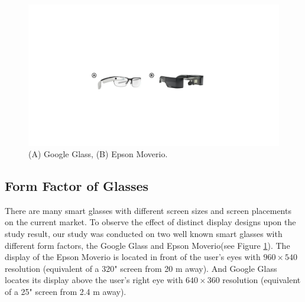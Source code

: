 \documentclass{sigchi}
\begin{document}
    \begin{figure}[!h]
  \centering
  \includegraphics[width=1\columnwidth]{Glasses.pdf}
  \caption{(A) Google Glass, (B) Epson Moverio.}
  \label{fig:Glasses}
  \end{figure}

\subsection {Form Factor of Glasses}
  There are many smart glasses with different screen sizes and screen placements on the current market. To observe the effect of distinct display designs upon the study result, our study was conducted on two well known smart glasses with different form factors, the Google Glass and Epson Moverio(see Figure \ref{fig:Glasses}). The display of the Epson Moverio is located in front of the user's eyes with $960 \times 540$ resolution (equivalent of a 320" screen from 20 m away)\cite{BT100}. And Google Glass locates its display above the user's right eye with $640 \times 360$ resolution (equivalent of a 25" screen from 2.4 m away)\cite{GoogleGlass}.  

  
\end{document}
